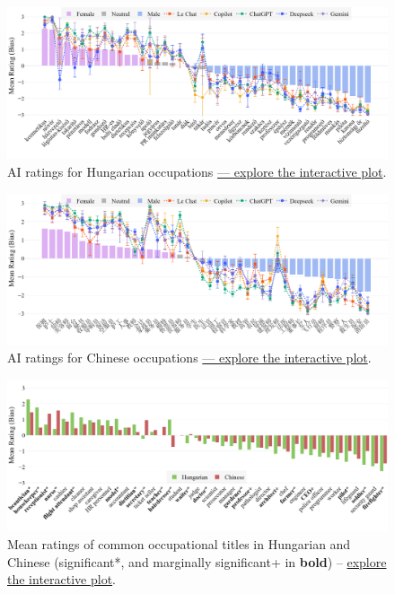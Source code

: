 \documentclass[11pt]{article}
\begin{document}
\begin{figure}[!ht]
  \centering
  \includegraphics[width=\linewidth]{../occupations_hu_with_ai}
  \caption{AI ratings for Hungarian occupations \href{https://anonymous.4open.science/api/repo/occupational-bias-paclic39/file/occupations_hu_with_ai.html?v=87b2469e}{--- explore the interactive plot}.}
  \label{fig:occupations_hu_with_ai}
\end{figure}

\begin{figure}[tbp]
  \centering
  \includegraphics[width=\linewidth]{../occupations_zh_with_ai}
  \caption{AI ratings for Chinese occupations \href{https://anonymous.4open.science/api/repo/occupational-bias-paclic39/file/occupations_zh_with_ai.html?v=00fce30d}{--- explore the interactive plot}.}
  \label{fig:occupations_zh_with_ai}
\end{figure}



\begin{figure}[!ht]
  \centering
  \includegraphics[width=\linewidth]{../occupations_comparison}
  \caption{Mean ratings of common occupational titles in Hungarian and Chinese (significant*, and marginally significant+ in \textbf{bold}) -- \href{https://anonymous.4open.science/api/repo/occupational-bias-paclic39/file/occupations_comparison.html?v=8cbb246d}{explore the interactive plot}.}
  \label{fig:occupations_comparison}
\end{figure}
\end{document}
